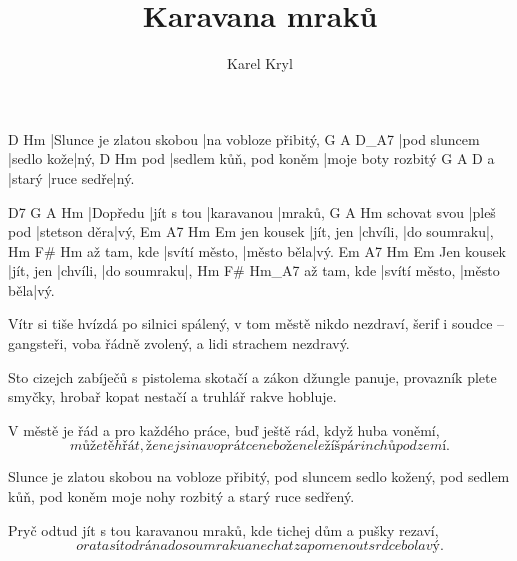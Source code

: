 \documentclass{song}
\title{Karavana mraků}
\author{Karel Kryl}
\begin{document}
\strophe
D                        Hm
|Slunce je zlatou skobou |na vobloze přibitý,
G            A          D_A7
|pod sluncem |sedlo kože|ný,
    D                      Hm
pod |sedlem kůň, pod koněm |moje boty rozbitý
  G      A          D
a |starý |ruce sedře|ný.
\endstrophe

D7      G          A          Hm
|Dopředu |jít s tou |karavanou |mraků,
             G         A            Hm
schovat svou |pleš pod |stetson děra|vý,
           Em        A7       Hm          Em
jen kousek |jít, jen |chvíli, |do soumraku|,
			Hm            F#        Hm
až tam, kde |svítí město, |město běla|vý.
           Em        A7       Hm          Em
Jen kousek |jít, jen |chvíli, |do soumraku|,
			Hm            F#         Hm_A7
až tam, kde |svítí město, |město běla|vý.
\endstrophe

\strophe*
Vítr si tiše hvízdá po silnici spálený,
v tom městě nikdo nezdraví,
šerif i soudce -- gangsteři, voba řádně zvolený,
a lidi strachem nezdravý.
\endstrophe

\strophe*
Sto cizejch zabíječů s pistolema skotačí
a zákon džungle panuje,
provazník plete smyčky, hrobař kopat nestačí
a truhlář rakve hobluje.
\endstrophe

V městě je řád a pro každého práce,
buď ještě rád, když huba voněmí,
\[ může tě hřát, že nejsi na voprátce
nebo že neležíš pár inchů pod zemí. \]
\endstrophe

\strophe*
Slunce je zlatou skobou na vobloze přibitý,
pod sluncem sedlo kožený,
pod sedlem kůň, pod koněm moje nohy rozbitý
a starý ruce sedřený.
\endstrophe

Pryč odtud jít s tou karavanou mraků,
kde tichej dům a pušky rezaví,
\[ orat a sít od rána do soumraku
a nechat zapomenout srdce bolavý. \]
\endstrophe
\end{document}
